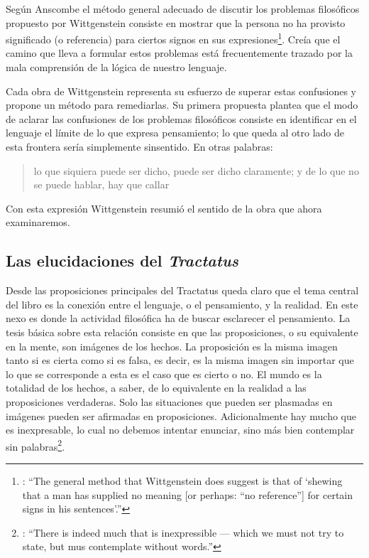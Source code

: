 Según Anscombe el método general adecuado de discutir los problemas filosóficos propuesto por Wittgenstein consiste en mostrar que la persona no ha provisto significado (o referencia) para ciertos signos en sus expresiones\footnote{\cite[Cf.~][151]{anscombe1959iwt}: \enquote{The general method that Wittgenstein does suggest is that of `shewing that a man has supplied no meaning [or perhaps: ``no reference''] for certain signs in his sentences'.}}. Creía que el camino que lleva a formular estos problemas está frecuentemente trazado por la mala comprensión de la lógica de nuestro lenguaje.

Cada obra de Wittgenstein representa su esfuerzo de superar estas confusiones y propone un método para remediarlas. Su primera propuesta plantea que el modo de aclarar las confusiones de los problemas filosóficos consiste en identificar en el lenguaje el límite de lo que expresa pensamiento; lo que queda al otro lado de esta frontera sería simplemente sinsentido. En otras palabras: \blockquote[{\cite[11]{wittgenstein1922tractatuses}}]{lo que siquiera puede ser dicho, puede ser dicho claramente; y de lo que no se puede hablar, hay que callar}. Con esta expresión Wittgenstein resumió el sentido de la obra que ahora examinaremos.

\subsection{Las elucidaciones del \emph{Tractatus}}
Desde las proposiciones principales del Tractatus queda claro que el tema central del libro es la conexión entre el lenguaje, o el pensamiento, y la realidad.
En este nexo es donde la actividad filosófica ha de buscar esclarecer el pensamiento.
La tesis básica sobre esta relación consiste en que las proposiciones, o su equivalente en la mente, son imágenes de los hechos.
La proposición es la misma imagen tanto si es cierta como si es falsa, es decir, es la misma imagen sin importar que lo que se corresponde a esta es el caso que es cierto o no. El mundo es la totalidad de los hechos, a saber, de lo equivalente en la realidad a las proposiciones verdaderas.
Solo las situaciones que pueden ser plasmadas en imágenes pueden ser afirmadas en proposiciones. Adicionalmente hay mucho que es inexpresable, lo cual no debemos intentar enunciar, sino más bien contemplar sin palabras\footnote{\cite[Cf.~][19]{anscombe1959iwt}: \enquote{There is indeed much that is inexpressible --- which we must not try to state, but mus contemplate without words.}}.

